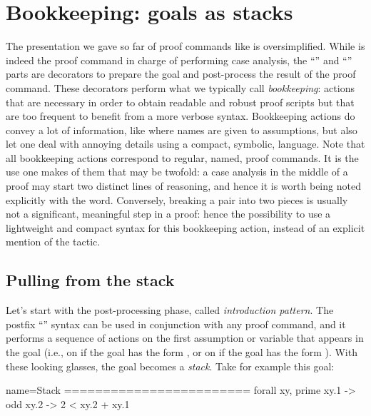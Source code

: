 \section{Bookkeeping: goals as stacks}\label{ssec:stack}

The presentation we gave so far of proof commands like 
is oversimplified.  While  is indeed the proof command in
charge of performing case analysis, the ``'' and ``\C{=> [|m]}''
parts are decorators to prepare the goal and post-process the result of
the proof command.  These decorators perform what we typically call
\emph{bookkeeping}: actions that are necessary in order to obtain readable and
robust proof scripts but that are too frequent to benefit from a more verbose
syntax.  Bookkeeping actions do convey a lot of information, like where
names are given to assumptions, but also let one deal with annoying details
using a compact, symbolic, language.  Note that all bookkeeping actions
correspond to regular, named, proof commands.  It is the use one makes of them
that may be twofold: a case analysis in the middle of a proof may start two
distinct lines of reasoning, and hence it is worth being noted explicitly with
the  word. Conversely, breaking a pair into two pieces is
usually not a significant, meaningful step in a proof: hence the
possibility to use a lightweight and compact syntax for this bookkeeping
action, instead of an explicit mention of the  tactic.

\subsection{Pulling from the stack}

Let's start with the post-processing phase, called \emph{introduction pattern}.
The postfix ``'' syntax can be used in conjunction with any proof
command, and it performs a sequence of actions on the first
assumption or variable that appears in the goal (i.e., on
 if the goal has the form , or on
 if the goal has the form ).
With these looking glasses, the goal becomes a
\emph{stack}. Take for example this goal:

\begin{coqout}{name=Stack}{}
========================
forall xy, prime xy.1 -> odd xy.2 -> 2 < xy.2 + xy.1
\end{coqout}

